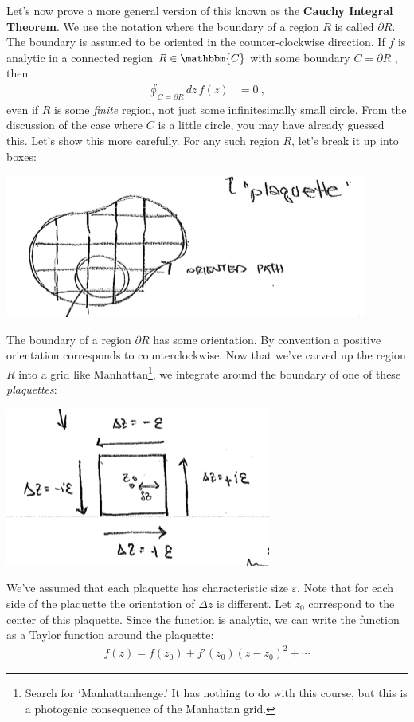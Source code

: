 Let's now prove a more general version of this known as the \textbf{Cauchy Integral Theorem}. We use the notation where the boundary of a region $R$ is called $\partial R$. The boundary is assumed to be oriented in the counter-clockwise direction. If $f$ is analytic in a connected region $R \in \mathbbm{C}$ with some boundary $C = \partial R$ , then 
\begin{align}
  \oint_{C=\partial R} dz\, f(z) &= 0 \ ,
\end{align}
even if $R$ is some \emph{finite} region, not just some infinitesimally small circle. From the discussion of the case where $C$ is a little circle, you may have already guessed this. Let's show this more carefully. For any such region $R$, let's break it up into boxes:
\begin{center}
\includegraphics[width=.5\textwidth]{figures/Lec_2017_12_plaquette.png}
\end{center}
The boundary of a region $\partial R$ has some orientation. By convention a positive orientation corresponds to counterclockwise. Now that we've carved up the region $R$ into a grid like Manhattan\footnote{Search for `Manhattanhenge.' It has nothing to do with this course, but this is a photogenic consequence of the Manhattan grid.}, we integrate around the boundary of one of these \emph{plaquettes}:
\begin{center}
\includegraphics[width=.4\textwidth]{figures/Lec_2017_plaq_int.png}
\end{center}
We've assumed that each plaquette has characteristic size $\varepsilon$. Note that for each side of the plaquette the orientation of $\Delta z$ is different. Let $z_0$ correspond to the center of this plaquette. Since the function is analytic, we can write the function as a Taylor function around the plaquette:
\begin{align}
  f(z) = f(z_0) + f'(z_0) (z-z_0)^2 + \cdots
\end{align}
